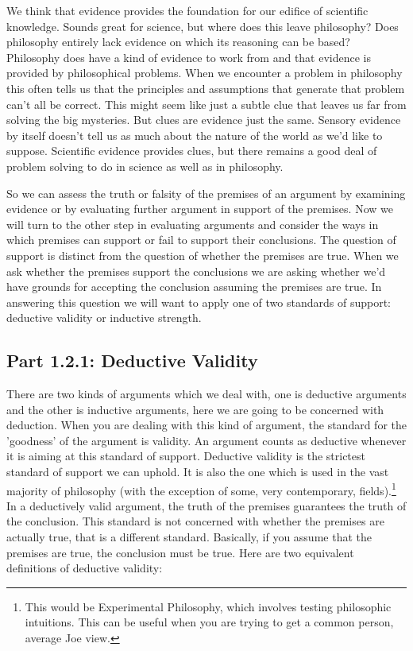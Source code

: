 We think that evidence provides the foundation for our edifice of scientific knowledge. Sounds great for science, but where does this leave philosophy? Does philosophy entirely lack evidence on which its reasoning can be based? Philosophy does have a kind of evidence to work from and that evidence is provided by philosophical problems. When we encounter a problem in philosophy this often tells us that the principles and assumptions that generate that problem can’t all be correct. This might seem like just a subtle clue that leaves us far from solving the big mysteries. But clues are evidence just the same. Sensory evidence by itself doesn’t tell us as much about the nature of the world as we’d like to suppose. Scientific evidence provides clues, but there remains a good deal of problem solving to do in science as well as in philosophy.

So we can assess the truth or falsity of the premises of an argument by examining evidence or by evaluating further argument in support of the premises. Now we will turn to the other step in evaluating arguments and consider the ways in which premises can support or fail to support their conclusions. The question of support is distinct from the question of whether the premises are true. When we ask whether the premises support the conclusions we are asking whether we’d have grounds for accepting the conclusion assuming the premises are true. In answering this question we will want to apply one of two standards of support: deductive validity or inductive strength.

\subsection{Part 1.2.1: Deductive Validity}
\label{s:p1.2.1}
There are two kinds of arguments which we deal with, one is \glspl{deductive argument} and the other is inductive arguments, here we are going to be concerned with deduction. When you are dealing with this kind of argument, the standard for the 'goodness' of the argument is validity. An argument counts as deductive whenever it is aiming at this standard of support. Deductive validity is the strictest standard of support we can uphold. It is also the one which is used in the vast majority of philosophy (with the exception of some, very contemporary, fields).\footnote{This would be Experimental Philosophy, which involves testing philosophic intuitions. This can be useful when you are trying to get a common person, average Joe view.} In a deductively \gls{valid} argument, the truth of the premises guarantees the truth of the conclusion. This standard is not concerned with whether the premises are actually true, that is a different standard. Basically, if you assume that the premises are true, the conclusion must be true. Here are two equivalent definitions of deductive validity:

